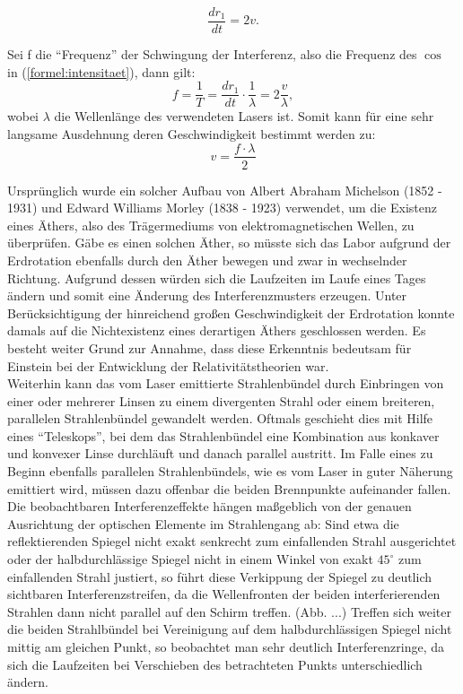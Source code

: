 \begin{equation}
\frac{d r_{1}}{d t} = 2 v.
\end{equation}

Sei f die \enquote{Frequenz} der Schwingung der Interferenz, also die Frequenz des $ \cos $ in (\ref{formel:intensitaet}), dann gilt: 
\begin{equation}
f = \frac{1}{T} = \frac{d r_{1}}{d t} \cdot \frac{1}{\lambda} = 2 \frac{v}{\lambda},
\end{equation}
wobei $ \lambda $ die Wellenlänge des verwendeten Lasers ist. 
Somit kann für eine sehr langsame Ausdehnung deren Geschwindigkeit bestimmt werden zu: 
\begin{equation}
v = \frac{f \cdot \lambda}{2}
\end{equation}


Ursprünglich wurde ein solcher Aufbau von Albert Abraham Michelson (1852 - 1931) und Edward Williams Morley (1838 - 1923) verwendet, um die Existenz eines Äthers, also des Trägermediums von elektromagnetischen Wellen, zu überprüfen. Gäbe es einen solchen Äther, so müsste sich das Labor aufgrund der Erdrotation ebenfalls durch den Äther bewegen und zwar in wechselnder Richtung. Aufgrund dessen würden sich die Laufzeiten im Laufe eines Tages ändern und somit eine Änderung des Interferenzmusters erzeugen. Unter Berücksichtigung der hinreichend großen Geschwindigkeit der Erdrotation konnte damals auf die Nichtexistenz eines derartigen Äthers geschlossen werden. Es besteht weiter Grund zur Annahme, dass diese Erkenntnis bedeutsam für Einstein bei der Entwicklung der Relativitätstheorien war. \\



Weiterhin kann das vom Laser emittierte Strahlenbündel durch Einbringen von einer oder mehrerer Linsen zu einem divergenten Strahl oder einem breiteren, parallelen Strahlenbündel gewandelt werden. Oftmals geschieht dies mit Hilfe eines \enquote{Teleskops}, bei dem das Strahlenbündel eine Kombination aus konkaver und konvexer Linse durchläuft und danach parallel austritt. Im Falle eines zu Beginn ebenfalls parallelen Strahlenbündels, wie es vom Laser in guter Näherung emittiert wird, müssen dazu offenbar die beiden Brennpunkte aufeinander fallen.  \\

Die beobachtbaren Interferenzeffekte hängen maßgeblich von der genauen Ausrichtung der optischen Elemente im Strahlengang ab: 
Sind etwa die reflektierenden Spiegel nicht exakt senkrecht zum einfallenden Strahl ausgerichtet oder der halbdurchlässige Spiegel nicht in einem Winkel von exakt $ 45 ^\circ$  zum einfallenden Strahl justiert, so führt diese Verkippung der Spiegel zu deutlich sichtbaren Interferenzstreifen, da die Wellenfronten der beiden interferierenden Strahlen dann nicht parallel auf den Schirm treffen. (Abb. ...) Treffen sich weiter die beiden Strahlbündel bei Vereinigung auf dem halbdurchlässigen Spiegel nicht mittig am gleichen Punkt, so beobachtet man sehr deutlich Interferenzringe, da sich die Laufzeiten bei Verschieben des betrachteten Punkts unterschiedlich ändern. 


